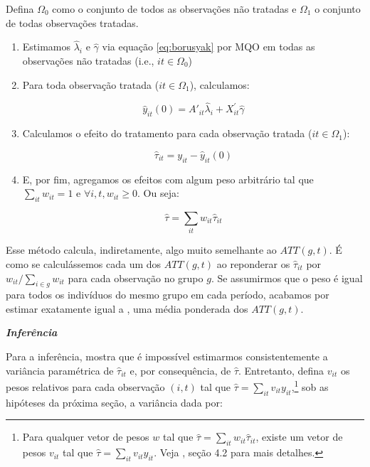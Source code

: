 \documentclass[portugues]{article}
\begin{document}
Defina $\Omega_0$ como o conjunto de todos as observações não tratadas e $\Omega_1$ o conjunto de todas observações tratadas.

\begin{enumerate}
    \item Estimamos $\hat{\lambda}_i$ e $\hat{\gamma}$ via equação \ref{eq:borusyak} por MQO em todas as observações não tratadas (i.e., $it \in \Omega_0$)

    \item Para toda observação tratada ($it \in \Omega_1$), calculamos:

    $$\hat{y}_{it}(0) = A'_{it} \hat{\lambda}_i + X^\prime_{it} \hat{\gamma}$$
    
    \item Calculamos o efeito do tratamento para cada observação tratada ($it \in \Omega_1$):

    $$ \hat{\tau}_{it} = y_{it} - \hat{y}_{it}(0)  $$ 

    \item E, por fim, agregamos os efeitos com algum peso arbitrário tal que $\sum_{it} w_{it} = 1$ e $\forall i,t, w_{it} \geq 0$. Ou seja:

    $$ \hat{\tau} = \sum_{it} w_{it} \hat{\tau}_{it} $$

\end{enumerate}


Esse método calcula, indiretamente, algo muito semelhante ao $ATT(g,t)$. É como se calculássemos cada um dos $ATT(g,t)$ ao reponderar os $\hat{\tau}_{it}$ por $w_{it}/\sum_{i \in g} w_{it}$ para cada observação no grupo $g$. Se assumirmos que o peso é igual para todos os indivíduos do mesmo grupo em cada período, acabamos por estimar exatamente igual a \citet{callaway2021difference}, uma média ponderada dos $ATT(g,t)$.

\vspace{5mm}

{\large \textbf{\textit{Inferência}}}

\vspace{2.5mm}

Para a inferência, \cite{borusyak2024revisiting} mostra que é impossível estimarmos consistentemente a variância paramétrica de $\hat{\tau}_{it}$ e, por consequência, de $\hat{\tau}$. Entretanto, defina $v_{it}$ os pesos relativos para cada observação $(i,t)$ tal que $\hat{\tau} = \sum_{it} v_{it} y_{it}$,\footnote{Para qualquer vetor de pesos $w$ tal que $\hat{\tau} = \sum_{it} w_{it} \hat{\tau}_{it}$, existe um vetor de pesos $v_{it}$ tal que $\hat{\tau} = \sum_{it} v_{it} y_{it}$. Veja \cite{borusyak2024revisiting}, seção 4.2 para mais detalhes.} sob as hipóteses da próxima seção, a variância dada por:
\end{document}
